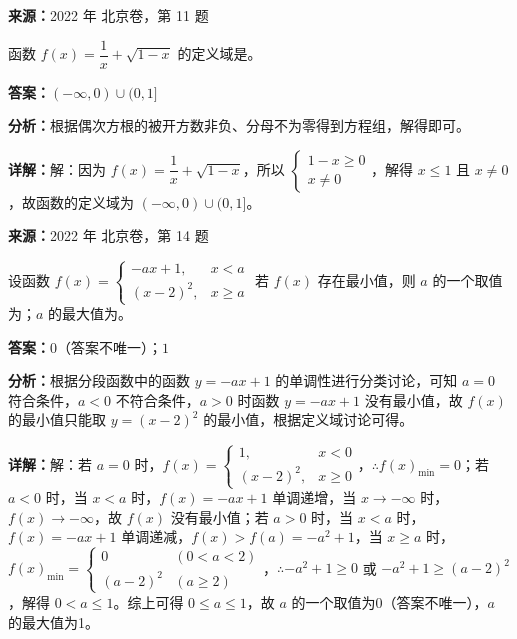 \begin{question}[points=5]
\textbf{来源：}2022 年 北京卷，第 11 题\par
函数 $f(x) = \dfrac{1}{x} + \sqrt{1-x}$ 的定义域是。
\fillin[{$(-\infty,0) \cup (0,1]$}]
\begin{solution}
\textbf{答案：}$(-\infty,0) \cup (0,1]$

\textbf{分析：}根据偶次方根的被开方数非负、分母不为零得到方程组，解得即可。

\textbf{详解：}解：因为 $f(x) = \dfrac{1}{x} + \sqrt{1-x}$，所以 $\begin{cases} 1-x \geq 0 \\ x \neq 0 \end{cases}$，解得 $x \leq 1$ 且 $x \neq 0$，故函数的定义域为 $(-\infty,0) \cup (0,1]$。
\end{solution}
\end{question}

\begin{question}[points=5]
\textbf{来源：}2022 年 北京卷，第 14 题\par
设函数 $f(x) = \begin{cases} -ax+1, & x < a \\ (x-2)^2, & x \geq a \end{cases}$ 若 $f(x)$ 存在最小值，则 $a$ 的一个取值为；$a$ 的最大值为。
\fillin[{$0$（答案不唯一）；$1$}]
\begin{solution}
\textbf{答案：}$0$（答案不唯一）；$1$

\textbf{分析：}根据分段函数中的函数 $y = -ax+1$ 的单调性进行分类讨论，可知 $a=0$ 符合条件，$a<0$ 不符合条件，$a>0$ 时函数 $y=-ax+1$ 没有最小值，故 $f(x)$ 的最小值只能取 $y=(x-2)^2$ 的最小值，根据定义域讨论可得。

\textbf{详解：}解：若 $a=0$ 时，$f(x)=\begin{cases} 1, & x<0 \\ (x-2)^2, & x\geq 0 \end{cases}$，$\therefore f(x)_{\min}=0$；若 $a<0$ 时，当 $x<a$ 时，$f(x)=-ax+1$ 单调递增，当 $x\to -\infty$ 时，$f(x)\to -\infty$，故 $f(x)$ 没有最小值；若 $a>0$ 时，当 $x<a$ 时，$f(x)=-ax+1$ 单调递减，$f(x) > f(a) = -a^2+1$，当 $x\geq a$ 时，$f(x)_{\min}=\begin{cases} 0 & (0<a<2) \\ (a-2)^2 & (a\geq 2) \end{cases}$，$\therefore -a^2+1\geq 0$ 或 $-a^2+1\geq (a-2)^2$，解得 $0<a\leq 1$。综上可得 $0\leq a\leq 1$，故 $a$ 的一个取值为0（答案不唯一），$a$ 的最大值为1。
\end{solution}
\end{question}

